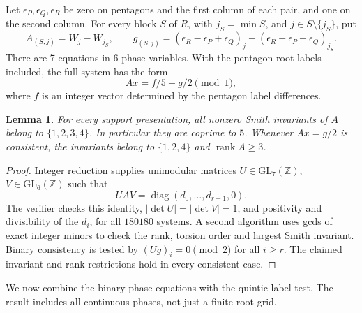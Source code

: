 \documentclass[11pt,a4paper]{article}
\newtheorem{lemma}[theorem]{Lemma}
\theoremstyle{plain}
\theoremstyle{definition}
\theoremstyle{plain}
\begin{document}
Let $\epsilon_P,\epsilon_Q,\epsilon_R$ be zero on pentagons and the first column of each pair, and one on the second column. For every block $S$ of $R$, with $j_S=\min S$, and $j\in S\setminus\{j_S\}$, put
$$A_{(S,j)}=W_j-W_{j_S},\qquad g_{(S,j)}=(\epsilon_R-\epsilon_P+\epsilon_Q)_j -(\epsilon_R-\epsilon_P+\epsilon_Q)_{j_S}.$$
There are 7 equations in 6 phase variables. With the pentagon root labels included, the full system has the form
\[
Ax=f/5+g/2\pmod1,
\]
where $f$ is an integer vector determined by the pentagon label differences.

\par\addvspace{\medskipamount}\noindent
\begin{minipage}{\linewidth}
\begin{lemma}\label{n11_noA_DDD:smith}
For every support presentation, all nonzero Smith invariants of $A$ belong to $\{1,2,3,4\}$. In particular they are coprime to $5$. Whenever $Ax=g/2$ is consistent, the invariants belong to $\{1,2,4\}$ and $\operatorname{rank}A\ge3$.
\end{lemma}
\end{minipage}
\par\addvspace{\medskipamount}

\begin{proof}
Integer reduction supplies unimodular matrices $U\in\mathrm{GL}_7(\mathbb{Z})$, $V\in\mathrm{GL}_6(\mathbb{Z})$ such that
$$UAV=\operatorname{diag}(d_0,\ldots,d_{r-1},0).$$
The verifier checks this identity, $|\det U|=|\det V|=1$, and positivity and divisibility of the $d_i$, for all $180180$ systems. A second algorithm uses gcds of exact integer minors to check the rank, torsion order and largest Smith invariant. Binary consistency is tested by $(Ug)_i=0\pmod2$ for all $i\ge r$. The claimed invariant and rank restrictions hold in every consistent case.
\end{proof}

We now combine the binary phase equations with the quintic label test. The result includes all continuous phases, not just a finite root grid.
\end{document}
